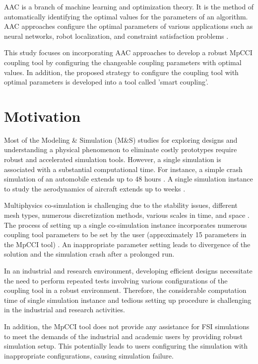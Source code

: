 AAC is a branch of machine learning and optimization theory. It is the method of automatically identifying the optimal values for the parameters of an algorithm. AAC approaches configure the optimal parameters of various applications such as neural networks, robot localization, and constraint satisfaction problems \cite{AAC_Mainreview} \cite{OscarLima_SMAC} \cite{Bharath_SMAC}.

This study focuses on incorporating AAC approaches to develop a robust MpCCI coupling tool by configuring the changeable coupling parameters with optimal values. In addition, the proposed strategy to configure the coupling tool with optimal parameters is developed into a tool called 'smart coupling'.

\section{Motivation}

Most of the Modeling \& Simulation (M\&S) studies for exploring designs and understanding a physical phenomenon to eliminate costly prototypes require robust and accelerated simulation tools. However, a single simulation is associated with a substantial computational time. For instance, a simple crash simulation of an automobile extends up to 48 hours \cite{EGO_Basepaper}. A single simulation instance to study the aerodynamics of aircraft extends up to weeks \cite{aerodynamics_time}.

Multiphysics co-simulation is challenging due to the stability issues, different mesh types, numerous discretization methods, various scales in time, and space \cite{FSI_Bungartz}. The process of setting up a single co-simulation instance incorporates numerous coupling tool parameters to be set by the user (approximately 15 parameters in the MpCCI tool) \cite{MpCCI_documentation}. An inappropriate parameter setting leads to divergence of the solution and the simulation crash after a prolonged run.

In an industrial and research environment, developing efficient designs necessitate the need to perform repeated tests involving various configurations of the coupling tool in a robust environment. Therefore, the considerable computation time of single simulation instance and tedious setting up procedure is challenging in the industrial and research activities.

In addition, the MpCCI tool does not provide any assistance for FSI simulations to meet the demands of the industrial and academic users by providing robust simulation setup. This potentially leads to users configuring the simulation with inappropriate configurations, causing simulation failure.

